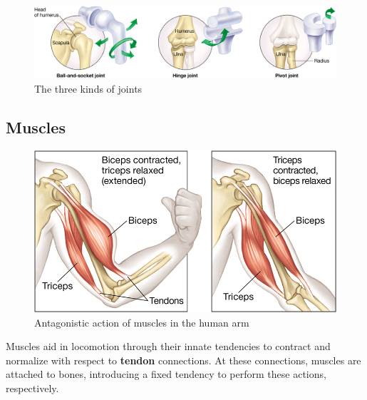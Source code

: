 \documentclass{article}
\begin{document}
\begin{figure}[h]
    \centering
    \includegraphics[width=\linewidth]{types_of_joints.png}
    \caption{The three kinds of joints}
\end{figure}

\subsection{Muscles}

\begin{figure}
  \centering
  \includegraphics[width=\linewidth]{muscle_action.png}
  \caption{Antagonistic action of muscles in the human arm}
\end{figure}

Muscles aid in locomotion through their innate tendencies to contract and
normalize with respect to \textbf{tendon} connections. At these connections,
muscles are attached to bones, introducing a fixed tendency to perform these
actions, respectively.
\end{document}

